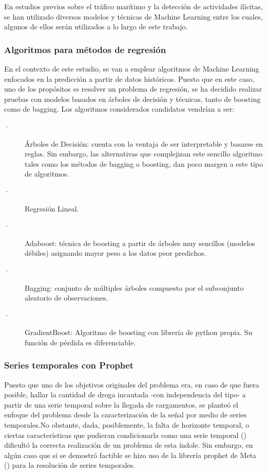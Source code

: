 \documentclass[12pt]{article}
\begin{document}
	En estudios previos sobre el tráfico marítimo y la detección de actividades ilícitas, se han utilizado diversos modelos y técnicas de Machine Learning entre los cuales, algunos de ellos serán utilizados a lo largo de este trabajo.
	
		\subsubsection{Algoritmos para métodos de regresión}
		En el contexto de este estudio, se van a emplear algoritmos de Machine Learning enfocados en la predicción a partir de datos históricos. Puesto que en este caso, uno de los propósitos es resolver un problema de regresión, se ha decidido realizar pruebas con modelos basados en árboles de decisión y técnicas, tanto de boosting como de bagging. Los algoritmos considerados candidatos vendrían a ser:
		
		\begin{description}
			\item[·] Árboles de Decisión: cuenta con la ventaja de ser interpretable y basarse en reglas. Sin embargo, las alternativas que complejizan este sencillo algoritmo tales como los métodos de bagging o boosting, dan poco margen a este tipo de algoritmos.
			\item[·] Regresión Lineal.
			\item[·] Adaboost: técnica de boosting a partir de árboles muy sencillos (modelos débiles) asignando mayor peso a los datos peor predichos.
			\item[·] Bagging: conjunto de múltiples árboles compuesto por el subconjunto aleatorio de observaciones.
			\item[·] GradientBoost: Algoritmo de boosting con librería de python propia. Su función de pérdida es diferenciable.
		\end{description}


		\subsubsection{\label{prophet}Series temporales con Prophet}
		Puesto que uno de los objetivos originales del problema era, en caso de que fuera posible, hallar la cantidad de droga incautada -con independencia del tipo- a partir de una serie temporal sobre la llegada de cargamentos, se planteó el enfoque del problema desde la caracterización de la señal por medio de series temporales.No obstante, dada, posiblemente, la falta de horizonte temporal, o ciertas características que pudieran condicionarla como una serie temporal (\cite{towardsdatascience2025timeseries}) dificultó la correcta realización de un problema de esta índole. Sin embargo, en algún caso que si se demostró factible se hizo uso de la librería prophet de Meta (\cite{Taylor2017}) para la resolución de series temporales.
		
\end{document}
